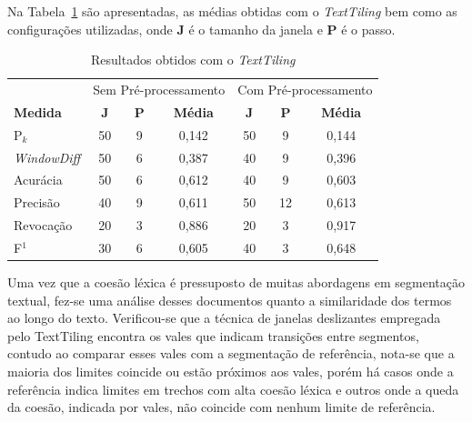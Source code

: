 Na Tabela~\ref{tab:resultadosTT} são apresentadas, as médias obtidas com o \textit{TextTiling} bem como as configurações utilizadas, onde \textbf{J} é o tamanho da janela e \textbf{P} é o passo.


\begin{table}[!h]
	\centering
	\begin{tabular}{|l||c|c|c||c|c|c|} \hline

		& \multicolumn{3}{c||}{Sem Pré-processamento} 
		& \multicolumn{3}{c|}{Com Pré-processamento}\\			

		\textbf{Medida} & 
		\textbf{J} &
		\textbf{P} & 
		\textbf{Média} &
		\textbf{J} &
		\textbf{P} & 
		\textbf{Média} \\	\hline

		P$_k$				& 50 & 9 & 0,142 & 50 & 9  & 0,144 \\ \hline
		\textit{WindowDiff}	& 50 & 6 & 0,387 & 40 & 9  & 0,396 \\ \hline
		Acurácia			& 50 & 6 & 0,612 & 40 & 9  & 0,603 \\ \hline
		Precisão			& 40 & 9 & 0,611 & 50 & 12 & 0,613 \\ \hline
		Revocação			& 20 & 3 & 0,886 & 20 & 3  & 0,917 \\ \hline
		F$^1$				& 30 & 6 & 0,605 & 40 & 3  & 0,648 \\ \hline

	\end{tabular}
	\caption{Resultados obtidos com o \textit{TextTiling}}
	\label{tab:resultadosTT}
\end{table}








Uma vez que a coesão léxica é pressuposto de muitas abordagens em segmentação textual, fez-se uma análise desses documentos quanto a similaridade dos termos ao longo do texto. Verificou-se que a técnica de janelas deslizantes empregada pelo TextTiling encontra os vales que indicam transições entre segmentos, contudo ao comparar esses vales com a segmentação de referência, nota-se que a maioria dos limites coincide  ou estão próximos aos vales, porém há casos onde a referência indica limites em trechos com alta coesão léxica e outros onde a queda da coesão, indicada por vales, não coincide com nenhum limite de referência. 



